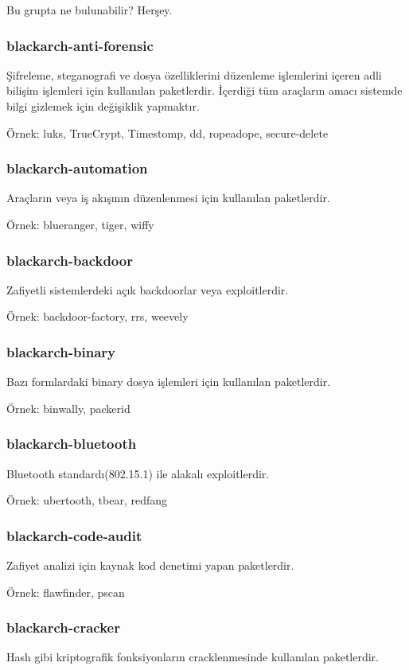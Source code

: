 \documentclass[a4paper, oneside, 11pt]{book}
\begin{document}
Bu grupta ne bulunabilir? Herşey.

\subsubsection{blackarch-anti-forensic}
Şifreleme, steganografi ve dosya özelliklerini düzenleme işlemlerini içeren adli bilişim işlemleri için kullanılan paketlerdir.
İçerdiği tüm araçların amacı sistemde bilgi gizlemek için değişiklik yapmaktır.

Örnek: luks, TrueCrypt, Timestomp, dd, ropeadope, secure-delete

\subsubsection{blackarch-automation}
Araçların veya iş akışının düzenlenmesi için kullanılan paketlerdir.

Örnek: blueranger, tiger, wiffy

\subsubsection{blackarch-backdoor}
Zafiyetli sistemlerdeki açık backdoorlar veya exploitlerdir.

Örnek: backdoor-factory, rrs, weevely

\subsubsection{blackarch-binary}
Bazı formlardaki binary dosya işlemleri için kullanılan paketlerdir.

Örnek: binwally, packerid

\subsubsection{blackarch-bluetooth}
Bluetooth standardı(802.15.1) ile alakalı exploitlerdir.

Örnek: ubertooth, tbear, redfang

\subsubsection{blackarch-code-audit}
Zafiyet analizi için kaynak kod denetimi yapan paketlerdir.

Örnek: flawfinder, pscan

\subsubsection{blackarch-cracker}
Hash gibi kriptografik fonksiyonların cracklenmesinde kullanılan paketlerdir.
\end{document}
